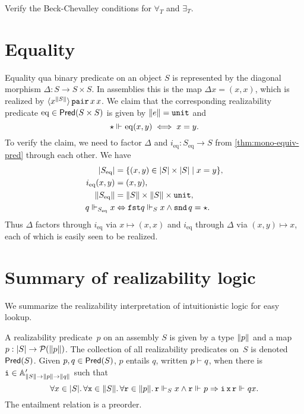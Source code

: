 \begin{exercise}
  Verify the Beck-Chevalley conditions for $\forall_T$ and $\exists_T$.
\end{exercise}

\section{Equality}
\label{sec:equality}

Equality qua binary predicate on an object $S$ is represented by the diagonal morphism $\Delta : S \to S \times S$. In assemblies this is the map $\Delta x = (x, x)$, which is realized by $\tpcalam{x}{\T{S}} \combPair\,x\,x$.
%
We claim that the corresponding realizability predicate $\mathrm{eq} \in \Pred{S \times S}$ is given by $\T{e} = \unit$ and
%
\begin{equation*}
  \star \rz \mathrm{eq} (x, y)
  \iff
  x = y.
\end{equation*}
%
To verify the claim, we need to factor $\Delta$ and $i_\mathrm{eq} : S_\mathrm{eq} \to S$ from \cref{thm:mono-equiv-pred} through each other. We have
%
\begin{align*}
  \S{S_\mathrm{eq}} &= \set{(x, y) \in \S{S} \times \S{S} \mid x = y},
  \\
  i_\mathrm{eq} (x,y) &= (x, y),
  \\
  \T{S_\mathrm{eq}} &= \T{S} \times \T{S} \times \unit,
  \\
  q \rz[S_\mathrm{eq}] x &\liff \combFst q \rz[S] x \land \combSnd\,q = \star.
\end{align*}
%
Thus $\Delta$ factors through $i_\mathrm{eq}$ via $x \mapsto (x,x)$ and $i_\mathrm{eq}$ through $\Delta$ via $(x, y) \mapsto x$, each of which is easily seen to be realized.

\section{Summary of realizability logic}
\label{sec:realizability-summary}

We summarize the realizability interpretation of intuitionistic logic for easy lookup.

A realizability predicate~$p$ on an assembly $S$ is given by a type $\T{p}$ and a map $p : \S{S} \to \pow{\T{p}}$. The collection of all realizability predicates on~$S$ is denoted $\Pred{S}$. Given $p, q \in \Pred{S}$, $p$ entails $q$, written $p \entails q$, when there is $\R{i} \in \subAtyp{\T{S} \to \T{p} \to \T{q}}$ such that
%
\begin{equation*}
  \all{x \in \S{S}}
  \all{\R{x} \in \T{S}}
  \all{\R{r} \in \T{p}}
  \R{r} \rz[S] x
  \land
  \R{r} \rz p
  \lthen
  \R{i}\,\R{x}\,\R{r} \rz q x.
\end{equation*}
%
The entailment relation is a preorder.

